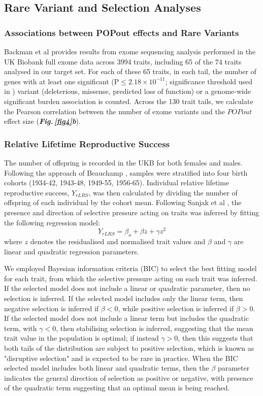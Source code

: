 \documentclass[12pt]{zHenriquesLab-StyleBioRxiv}
\newcommand\dref[2]{\normalsize{\textbf{\textit{Fig.\,\ref{#1}#2}}}\normalsize{}}
\begin{document}
\subsection*{Rare Variant and Selection Analyses} \label{sec:methods:rvs} 

\subsubsection*{Associations between POPout effects and Rare Variants}
Backman et al \cite{Backman2021} provides results from exome sequencing analysis 
performed in the UK Biobank full exome data across 3994 traits, including 65 of 
the 74 traits analysed in our target set. For each of these 65 traits, in each tail, 
the number of genes with at least one significant (P$\le 2.18\times 10^{-11}$; significance 
threshold used in \cite{Backman2021}) variant (deleterious, missense, predicted loss of function) or a 
genome-wide significant burden association is counted. Across the 130 trait tails, we 
calculate the Pearson correlation between the number of exome variants and the $POPout$ 
effect size (\dref{fig4}{b}). 
%
\subsubsection*{Relative Lifetime Reproductive Success}
The number of offspring is recorded in the UKB for both females and
males. Following the approach of Beauchamp \cite{v_select2}, samples were 
stratified into four birth cohorts (1934-42, 1943-48, 1949-55, 1956-65). Individual relative
lifetime reproductive success, $Y_{rLRS}$, was then calculated by
dividing the number of offspring of each individual by the cohort
mean. Following Sanjak et al \cite{Sanjack2018}, the presence and
direction of selective pressure acting on traits was inferred by
fitting the following regression model:
\begin{equation}
Y_{rLRS} = \beta_o + \beta z + \gamma z^2 \label{math:LRS}
\end{equation}
where $z$ denotes the residualised and normalised trait values and
$\beta$ and $\gamma$ are linear and quadratic regression parameters.

We employed Bayesian information criteria (BIC) to select the best
fitting model for each trait, from which the selective pressure acting
on each trait was inferred. If the selected model does not include a linear
or quadratic parameter, then no selection is inferred. If the selected model
includes only the linear term, then negative selection is inferred if $\beta<0$, 
while positive selection is inferred if $\beta>0$. If the selected model does not 
include a linear term but includes the quadratic term, with $\gamma<0$, then 
stabilising selection is inferred, suggesting that the mean trait value in the 
population is optimal; if instead $\gamma>0$, then this suggests that 
both tails of the distribution are subject to positive selection, which is known as 
"disruptive selection" and is expected to be rare in practice. When the BIC selected 
model includes both linear and quadratic terms, then the $\beta$ parameter indicates 
the general direction of selection as positive or negative, with presence of the quadratic 
term suggesting that an optimal mean is being reached.
%
\end{document}
